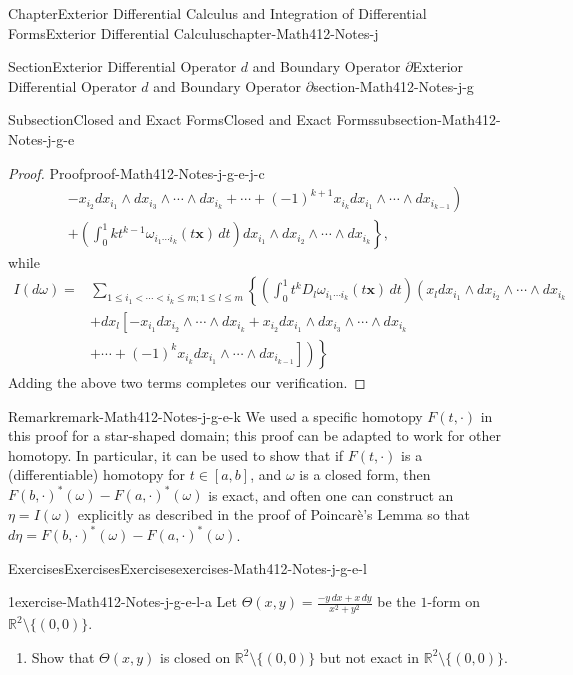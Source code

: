 \documentclass[oneside,10pt,]{book}
\numberwithin{equation}{section}
\newcommand{\bx}{\mathbf{x}}
\newcommand{\bbR}{\mathbb{R}}
\newcommand{\amp}{&}
\begin{document}
\begin{chapterptx}{Chapter}{Exterior Differential Calculus and Integration of Differential Forms}{}{Exterior Differential Calculus}{}{}{chapter-Math412-Notes-j}
\begin{sectionptx}{Section}{Exterior Differential Operator \(d\) and Boundary Operator \(\partial\)}{}{Exterior Differential Operator \(d\) and Boundary Operator \(\partial\)}{}{}{section-Math412-Notes-j-g}
\begin{subsectionptx}{Subsection}{Closed and Exact Forms}{}{Closed and Exact Forms}{}{}{subsection-Math412-Notes-j-g-e}
\begin{proof}{Proof}{}{proof-Math412-Notes-j-g-e-j-c}
\begin{align*}
\amp \left.- x_{i_{2}}dx_{i_{1}}\wedge dx_{i_{3}}\wedge \cdots \wedge dx_{i_{k}}+ \cdots +(-1)^{k+1} x_{i_{k}}dx_{i_{1}}\wedge\cdots \wedge dx_{i_{k-1}}\right) \\
\amp \left. +  \left(\int_{0}^{1} k t^{k-1}\omega_{i_{1}\cdots i_{k}}(t\bx)\,dt\right)d x_{i_{1}}\wedge dx_{i_{2}}\wedge\cdots \wedge dx_{i_{k}}\right\}, 
\end{align*}
while%
\begin{align*}
I(d\omega) 
= \amp \sum_{1\le i_{1} < \cdots < i_{k}\le m; 1\le l \le m} \left\{
\left( \int_{0}^{1} t^{k}D_{l}\omega_{i_{1}\cdots i_{k}}(t\bx)\,dt\right) 
\left(x_{l} d x_{i_{1}}\wedge dx_{i_{2}}\wedge\cdots \wedge dx_{i_{k}} 
\right. \right.\\
\amp +dx_{l}\left[
-x_{i_{1}} dx_{i_{2}}\wedge\cdots \wedge dx_{i_{k}}+ x_{i_{2}} dx_{i_{1}}\wedge dx_{i_{3}}\wedge \cdots \wedge dx_{i_{k}} \right. \\
\amp \left. \left.\left.+ \cdots +(-1)^{k} x_{i_{k}} dx_{i_{1}}\wedge\cdots \wedge dx_{i_{k-1}}\right]\right)\right\}
\end{align*}
Adding the above two terms completes our verification.%
\end{proof}
\begin{remark}{Remark}{}{remark-Math412-Notes-j-g-e-k}%
We used a specific homotopy \(F(t, \cdot)\) in this proof for a star-shaped domain; this proof can be adapted to work for other homotopy. In particular, it can be used to show that if \(F(t, \cdot)\) is a (differentiable) homotopy for \(t\in [a, b]\), and \(\omega\) is a closed form, then \(F(b, \cdot)^{*}(\omega) - F(a, \cdot)^{*}(\omega)\) is exact, and often one can construct an \(\eta=I(\omega)\) explicitly as described in the proof of Poincarè's Lemma so that \(d\eta= F(b, \cdot)^{*}(\omega) - F(a, \cdot)^{*}(\omega)\).%
\end{remark}
%
%
\typeout{************************************************}
\typeout{************************************************}
%
\begin{exercises-subsubsection-numberless}{Exercises}{Exercises}{}{Exercises}{}{}{exercises-Math412-Notes-j-g-e-l}
\begin{divisionexercise}{1}{}{}{exercise-Math412-Notes-j-g-e-l-a}%
Let   \(\Theta(x,y)=\frac{-y\, dx + x\, dy}{x^{2}+y^{2}}\) be the \(1\)-form on \(\bbR^{2}\setminus\{(0, 0)\}\).%
\begin{enumerate}[label=(\alph*)]
\item{}Show that  \(\Theta(x,y)\) is closed on \(\bbR^{2}\setminus\{(0, 0)\}\) but not exact in \(\bbR^{2}\setminus\{(0, 0)\}\).%

\end{enumerate}
\end{divisionexercise}
\end{exercises-subsubsection-numberless}
\end{subsectionptx}
\end{sectionptx}
\end{chapterptx}
\end{document}
